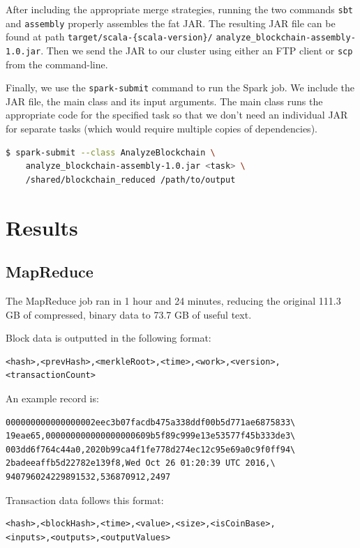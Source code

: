 \documentclass[9pt,twocolumn,twoside]{idsi}
\begin{document}
After including the appropriate merge strategies, running the two commands \lstinline{sbt} and \lstinline{assembly} properly assembles the fat JAR. The resulting JAR file can be found at path \lstinline|target/scala-{scala-version}/| \lstinline|analyze_blockchain-assembly-1.0.jar|. Then we send the JAR to our cluster using either an FTP client or \lstinline{scp} from the command-line.

Finally, we use the \lstinline{spark-submit} command to run the Spark job. We include the JAR file, the main class and its input arguments. The main class runs the appropriate code for the specified task so that we don't need an individual JAR for separate tasks (which would require multiple copies of dependencies).

\begin{lstlisting}[language=bash]
 $ spark-submit --class AnalyzeBlockchain \
    analyze_blockchain-assembly-1.0.jar <task> \
    /shared/blockchain_reduced /path/to/output
\end{lstlisting}

\section{Results}
\subsection{MapReduce}
The MapReduce job ran in 1 hour and 24 minutes, reducing the original 111.3 GB of compressed, binary data to 73.7 GB of useful text.

Block data is outputted in the following format:
\begin{lstlisting}
<hash>,<prevHash>,<merkleRoot>,<time>,<work>,<version>,
<transactionCount>
\end{lstlisting}

An example record is:
\begin{lstlisting}
000000000000000002eec3b07facdb475a338ddf00b5d771ae6875833\
19eae65,000000000000000000609b5f89c999e13e53577f45b333de3\
003dd6f764c44a0,2020b99ca4f1fe778d274ec12c95e69a0c9f0ff94\
2badeeaffb5d22782e139f8,Wed Oct 26 01:20:39 UTC 2016,\
940796024229891532,536870912,2497
\end{lstlisting}

Transaction data follows this format:
\begin{lstlisting}
<hash>,<blockHash>,<time>,<value>,<size>,<isCoinBase>,
<inputs>,<outputs>,<outputValues>
\end{lstlisting}
\end{document}
